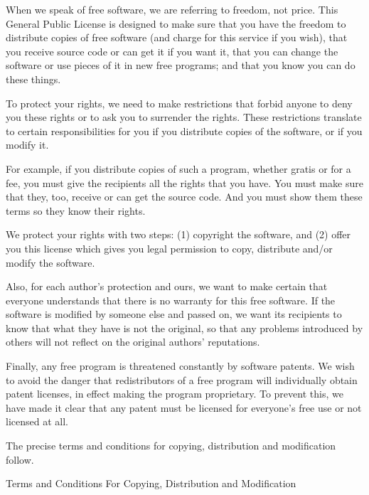 \documentclass[11pt, letterpaper]{book}
\begin{document}
When we speak of free software, we are referring to freedom, not price. This General Public License is designed to make sure that you have the freedom to distribute copies of free software (and charge for this service if you wish), that you receive source code or can get it if you want it, that you can change the software or use pieces of it in new free programs; and that you know you can do these things.

To protect your rights, we need to make restrictions that forbid anyone to deny you these rights or to ask you to surrender the rights. These restrictions translate to certain responsibilities for you if you distribute copies of the software, or if you modify it.

For example, if you distribute copies of such a program, whether gratis or for a fee, you must give the recipients all the rights that you have. You must make sure that they, too, receive or can get the source code. And you must show them these terms so they know their rights.

We protect your rights with two steps: (1) copyright the software, and (2) offer you this license which gives you legal permission to copy, distribute and/or modify the software.

Also, for each author's protection and ours, we want to make certain that everyone understands that there is no warranty for this free software. If the software is modified by someone else and passed on, we want its recipients to know that what they have is not the original, so that any problems introduced by others will not reflect on the original authors' reputations.

Finally, any free program is threatened constantly by software patents. We wish to avoid the danger that redistributors of a free program will individually obtain patent licenses, in effect making the program proprietary. To prevent this, we have made it clear that any patent must be licensed for everyone's free use or not licensed at all.

The precise terms and conditions for copying, distribution and modification follow.

\begin{center}
{\Large \sc Terms and Conditions For Copying, Distribution and
  Modification}
\end{center}
\end{document}

